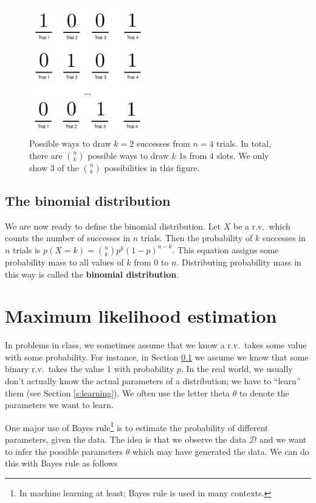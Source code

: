 \documentclass[]{article}
\theoremstyle{definition}
\begin{document}
\begin{figure}[!ht]
     \centering
     \includegraphics[width=5cm]{binomial_slots.pdf}
     \caption{Possible ways to draw $k=2$ successes from $n=4$ trials. In total, there are $n \choose k$ possible ways to draw $k$ 1s from 4 slots. We only show 3 of the $n \choose k$ possibilities in this figure.}\label{f:binomial_slots}
\end{figure}

\subsection{The binomial distribution}\label{s:binomial}

We are now ready to define the binomial distribution. Let $X$ be a r.v.\ which counts the number of successes in $n$ trials. Then the probability of $k$ successes in $n$ trials is $ p(X=k) = {n \choose k} p^k (1-p)^{n-k}$. This equation assigns some probability mass to all values of $k$ from 0 to $n$. Distributing probability mass in this way is called the \textbf{binomial distribution}.

\section{Maximum likelihood estimation} 

In problems in class, we sometimes assume that we know a r.v.\ takes some value with some probability. For instance, in Section \ref{s:binomial} we assume we know that some binary r.v.\ takes the value 1 with probability $p$. In the real world, we usually don't actually know the actual parameters of a distribution; we have to ``learn'' them (see Section \ref{s:learning}). We often use the letter theta $\theta$ to denote the parameters we want to learn. 

One major use of Bayes rule\footnote{In machine learning at least; Bayes rule is used in many contexts.} is to estimate the probability of different parameters, given the data. The idea is that we observe the data $\mathcal{D}$ and we want to infer the possible parameters $ \theta$ which may have generated the data. We can do this with Bayes rule as follows
\end{document}
